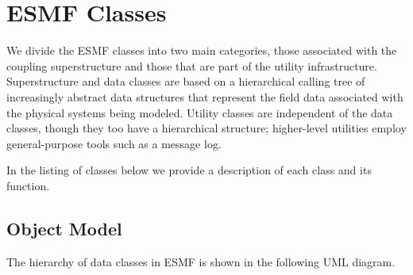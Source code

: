 \section{ESMF Classes}

We divide the ESMF classes into two main categories, those associated with the coupling 
superstructure and those that are part of the utility infrastructure.  Superstructure and data 
classes are based on a hierarchical 
calling tree of increasingly abstract data structures that represent the field data associated 
with the physical systems being modeled.  Utility classes are independent 
of the data classes, though they too have a hierarchical structure; higher-level utilities
employ general-purpose tools such as a message log.

In the listing of classes below we provide a description of each class and its function.

\subsection{Object Model}

The hierarchy of data classes in ESMF is shown in the following UML diagram.  


